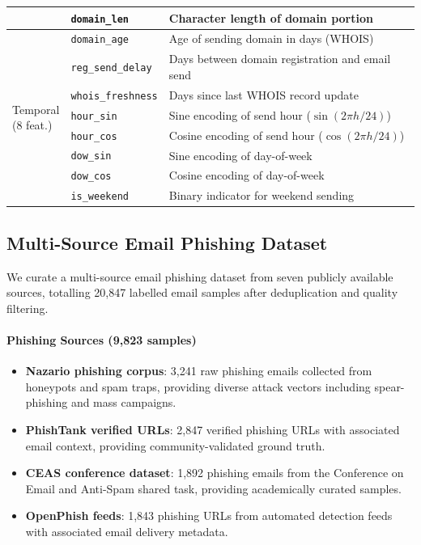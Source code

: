 \documentclass[conference]{IEEEtran}
\begin{document}
\begin{table}[t]
\begin{tabular}{p{1.3cm} p{1.8cm} p{4.4cm}}
  & \texttt{domain\_len} & Character length of domain portion \\
  \midrule
\multirow{8}{*}{\parbox{1.3cm}{Temporal\\(8 feat.)}}
  & \texttt{domain\_age} & Age of sending domain in days (WHOIS) \\
  & \texttt{reg\_send\_delay} & Days between domain registration and email send \\
  & \texttt{whois\_freshness} & Days since last WHOIS record update \\
  & \texttt{hour\_sin} & Sine encoding of send hour ($\sin(2\pi h / 24)$) \\
  & \texttt{hour\_cos} & Cosine encoding of send hour ($\cos(2\pi h / 24)$) \\
  & \texttt{dow\_sin} & Sine encoding of day-of-week \\
  & \texttt{dow\_cos} & Cosine encoding of day-of-week \\
  & \texttt{is\_weekend} & Binary indicator for weekend sending \\
\bottomrule
\end{tabular}
\end{table}

\subsection{Multi-Source Email Phishing Dataset}
\label{subsec:dataset}

We curate a multi-source email phishing dataset from seven publicly available
sources, totalling 20,847 labelled email samples after deduplication and
quality filtering.

\paragraph{Phishing Sources (9,823 samples)}
\begin{itemize}[leftmargin=*,itemsep=1pt]
  \item \textbf{Nazario phishing corpus}: 3,241 raw phishing emails collected
        from honeypots and spam traps, providing diverse attack vectors
        including spear-phishing and mass campaigns.
  \item \textbf{PhishTank verified URLs}: 2,847 verified phishing URLs with
        associated email context, providing community-validated ground truth.
  \item \textbf{CEAS conference dataset}: 1,892 phishing emails from the
        Conference on Email and Anti-Spam shared task, providing
        academically curated samples.
  \item \textbf{OpenPhish feeds}: 1,843 phishing URLs from automated
        detection feeds with associated email delivery metadata.
\end{itemize}
\end{document}
